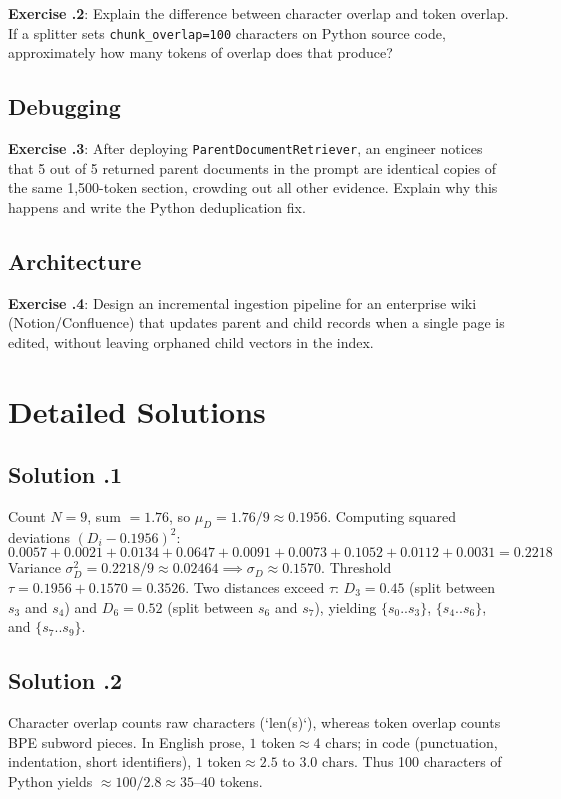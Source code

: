 \textbf{Exercise \thechapter.2}: Explain the difference between character overlap and token overlap. If a splitter sets \texttt{chunk\_overlap=100} characters on Python source code, approximately how many tokens of overlap does that produce?

\subsection*{Debugging}
\textbf{Exercise \thechapter.3}: After deploying \texttt{ParentDocumentRetriever}, an engineer notices that 5 out of 5 returned parent documents in the prompt are identical copies of the same 1,500-token section, crowding out all other evidence. Explain why this happens and write the Python deduplication fix.

\subsection*{Architecture}
\textbf{Exercise \thechapter.4}: Design an incremental ingestion pipeline for an enterprise wiki (Notion/Confluence) that updates parent and child records when a single page is edited, without leaving orphaned child vectors in the index.

\section{Detailed Solutions}

\subsection*{Solution \thechapter.1}
Count $N = 9$, sum $= 1.76$, so $\mu_D = 1.76 / 9 \approx 0.1956$. Computing squared deviations $(D_i - 0.1956)^2$:
\[
0.0057 + 0.0021 + 0.0134 + 0.0647 + 0.0091 + 0.0073 + 0.1052 + 0.0112 + 0.0031 = 0.2218
\]
Variance $\sigma_D^2 = 0.2218 / 9 \approx 0.02464 \implies \sigma_D \approx 0.1570$. Threshold $\tau = 0.1956 + 0.1570 = 0.3526$. Two distances exceed $\tau$: $D_3 = 0.45$ (split between $s_3$ and $s_4$) and $D_6 = 0.52$ (split between $s_6$ and $s_7$), yielding $\{s_0..s_3\}$, $\{s_4..s_6\}$, and $\{s_7..s_9\}$.

\subsection*{Solution \thechapter.2}
Character overlap counts raw characters (`len(s)`), whereas token overlap counts BPE subword pieces. In English prose, $1\text{ token} \approx 4\text{ chars}$; in code (punctuation, indentation, short identifiers), $1\text{ token} \approx 2.5\text{ to }3.0\text{ chars}$. Thus 100 characters of Python yields $\approx 100 / 2.8 \approx 35\text{--}40$ tokens.

